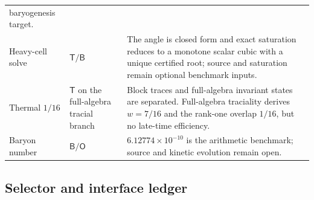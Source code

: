 \documentclass[12pt,a4paper]{article}
\begin{document}
\begin{longtable}{@{}L{0.22\textwidth}L{0.17\textwidth}L{0.53\textwidth}@{}}
baryogenesis target.\\
Heavy-cell solve
& \(\mathsf T/\mathsf B\)
& The angle is closed form and exact saturation reduces to a monotone scalar
cubic with a unique certified root; source and saturation remain optional
benchmark inputs.\\
Thermal \(1/16\)
& \(\mathsf T\) on the full-algebra tracial branch
& Block traces and full-algebra invariant states are separated.  Full-algebra
traciality derives \(w=7/16\) and the rank-one overlap \(1/16\), but no
late-time efficiency.\\
Baryon number
& \(\mathsf B/\mathsf O\)
& \(6.12774\times10^{-10}\) is the arithmetic benchmark; source and kinetic
evolution remain open.\\
\bottomrule
\end{longtable}

\subsection{Selector and interface ledger}
\label{p7v2:sec:selector-ledger}
\end{document}
